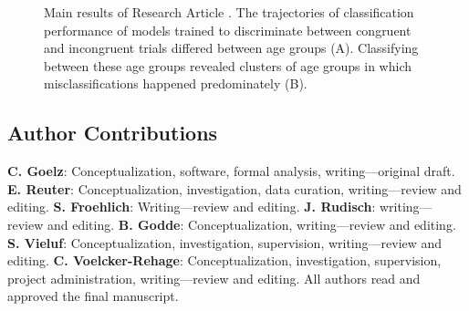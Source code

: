 \begin{figure}[h]
\begin{center}

\caption[Main results of Research Article .]{Main results of Research Article . The trajectories of classification performance of models trained to discriminate between congruent and incongruent trials differed between age groups (A). Classifying between these age groups revealed clusters of age groups in which misclassifications happened predominately (B).}
\label{fig:results2}
\end{center}
\end{figure}

\subsection*{Author Contributions}
\textbf{C. Goelz}: Conceptualization, software, formal analysis, writing—original draft.
\textbf{E. Reuter}: Conceptualization, investigation, data curation, writing—review and editing.
\textbf{S. Froehlich}: Writing—review and editing. 
\textbf{J. Rudisch}: writing—review and editing.
\textbf{B. Godde}: Conceptualization, writing—review and editing.
\textbf{S. Vieluf}: Conceptualization, investigation, supervision, writing—review and editing.
\textbf{C. Voelcker-Rehage}: Conceptualization, investigation, supervision, project administration, writing—review and editing. All authors read and approved the final manuscript.
